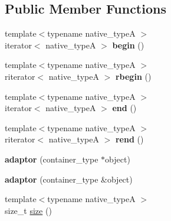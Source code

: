 \subsection*{Public Member Functions}
\begin{DoxyCompactItemize}
\item 
\hypertarget{classheterogeneous_1_1adaptor_ad8e0c3ca01a65885072b528b598ca14d}{}{\footnotesize template$<$typename native\+\_\+type\+A $>$ }\\iterator$<$ native\+\_\+type\+A $>$ {\bfseries begin} ()\label{classheterogeneous_1_1adaptor_ad8e0c3ca01a65885072b528b598ca14d}

\item 
\hypertarget{classheterogeneous_1_1adaptor_af40b2c1427fd09faffa1bd25485dc78b}{}{\footnotesize template$<$typename native\+\_\+type\+A $>$ }\\riterator$<$ native\+\_\+type\+A $>$ {\bfseries rbegin} ()\label{classheterogeneous_1_1adaptor_af40b2c1427fd09faffa1bd25485dc78b}

\item 
\hypertarget{classheterogeneous_1_1adaptor_a05c5594ad4629a266a59f67da6796f57}{}{\footnotesize template$<$typename native\+\_\+type\+A $>$ }\\iterator$<$ native\+\_\+type\+A $>$ {\bfseries end} ()\label{classheterogeneous_1_1adaptor_a05c5594ad4629a266a59f67da6796f57}

\item 
\hypertarget{classheterogeneous_1_1adaptor_a0b6eab9b87a19f3fafcd26af0eebb047}{}{\footnotesize template$<$typename native\+\_\+type\+A $>$ }\\riterator$<$ native\+\_\+type\+A $>$ {\bfseries rend} ()\label{classheterogeneous_1_1adaptor_a0b6eab9b87a19f3fafcd26af0eebb047}

\item 
\hypertarget{classheterogeneous_1_1adaptor_ad41b7c74b10ca0bc85e14751a05f7f31}{}{\bfseries adaptor} (container\+\_\+type $\ast$object)\label{classheterogeneous_1_1adaptor_ad41b7c74b10ca0bc85e14751a05f7f31}

\item 
\hypertarget{classheterogeneous_1_1adaptor_a463aa605b7f4950153be7c134c51ec7c}{}{\bfseries adaptor} (container\+\_\+type \&object)\label{classheterogeneous_1_1adaptor_a463aa605b7f4950153be7c134c51ec7c}

\item 
\hypertarget{classheterogeneous_1_1adaptor_aa586776a2972693fbd7ab1abb9ae9e45}{}{\footnotesize template$<$typename native\+\_\+type\+A $>$ }\\size\+\_\+t \hyperlink{classheterogeneous_1_1adaptor_aa586776a2972693fbd7ab1abb9ae9e45}{size} ()\label{classheterogeneous_1_1adaptor_aa586776a2972693fbd7ab1abb9ae9e45}


\end{DoxyCompactItemize}
